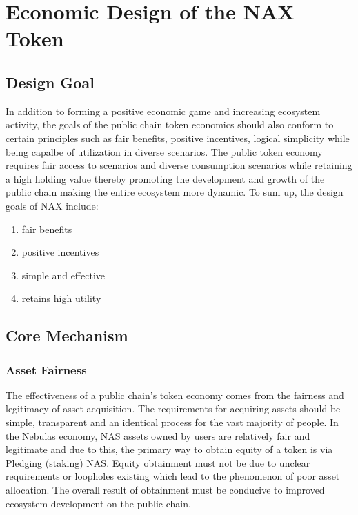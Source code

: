 \section{Economic Design of the NAX Token}
\subsection{Design Goal}
In addition to forming a positive economic game and increasing ecosystem activity, the goals of the public chain token economics should also conform to certain principles such as fair benefits, positive incentives, logical simplicity while being capalbe of utilization in diverse scenarios. The public token economy requires fair access to scenarios and diverse consumption scenarios while retaining a high holding value thereby promoting the development and growth of the public chain making the entire ecosystem more dynamic. To sum up, the design goals of NAX include:

\begin{enumerate}[\hspace{2cm}(a)]
    \item fair benefits
    \item positive incentives
    \item simple and effective
    \item retains high utility
\end{enumerate}

\subsection{Core Mechanism}

\subsubsection{Asset Fairness}
The effectiveness of a public chain's token economy comes from the fairness and legitimacy of asset acquisition. The requirements for acquiring assets should be simple, transparent and an identical process for the vast majority of people. In the Nebulas economy, NAS assets owned by users are relatively fair and legitimate and due to this, the primary way to obtain equity of a token is via Pledging (staking) NAS. Equity obtainment must not be due to unclear requirements or loopholes existing which lead to the phenomenon of poor asset allocation. The overall result of obtainment must be conducive to improved ecosystem development on the public chain.

